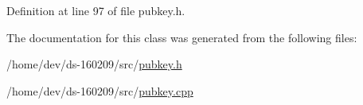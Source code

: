 Definition at line 97 of file pubkey.\+h.



The documentation for this class was generated from the following files\+:\begin{DoxyCompactItemize}
\item 
/home/dev/ds-\/160209/src/\hyperlink{pubkey_8h}{pubkey.\+h}\item 
/home/dev/ds-\/160209/src/\hyperlink{pubkey_8cpp}{pubkey.\+cpp}\end{DoxyCompactItemize}
